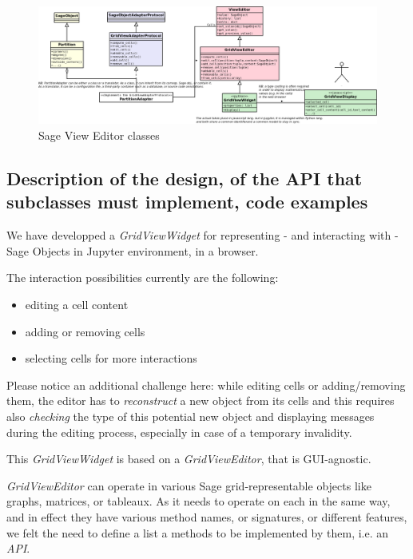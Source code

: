 \documentclass{deliverablereport}
\begin{document}
\begin{landscape}
\begin{figure}[h]
  \begin{center}
    \includegraphics[width=1.4\textheight]{schemas/SageViewEditor}
  \end{center}
  \caption{Sage View Editor classes}
  \label{fig:lmfdb}
\end{figure}
\end{landscape}

\subsection{Description of the design, of the API that subclasses must
  implement, code examples}

We have developped a \emph{GridViewWidget} for representing - and
interacting with - Sage Objects in Jupyter environment, in a browser.

The interaction possibilities currently are the following:
\begin{itemize}
  \item editing a cell content
  \item adding or removing cells
  \item selecting cells for more interactions
\end{itemize}

Please notice an additional challenge here: while editing cells or
adding/removing them, the editor has to \emph{reconstruct} a new
object from its cells and this requires also \emph{checking} the type of this
potential new object and displaying messages during the editing
process, especially in case of a temporary invalidity.

This \emph{GridViewWidget} is based on a \emph{GridViewEditor}, that
is GUI-agnostic.

\emph{GridViewEditor} can operate in various Sage grid-representable objects like graphs,
matrices, or tableaux. As it needs to operate on each in the same way,
and in effect they have various method names, or signatures, or
different features, we felt the need to define a list a methods to be
implemented by them, i.e. an \emph{API}.
\end{document}
